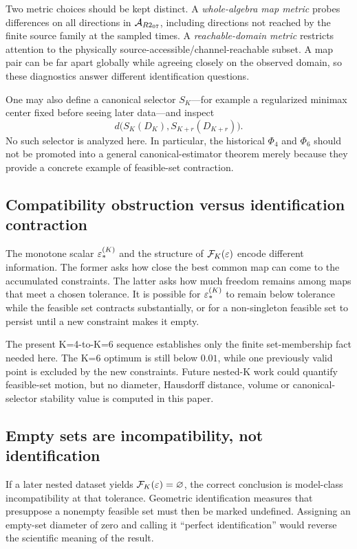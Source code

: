 Two metric choices should be kept distinct.  A \emph{whole-algebra map metric} probes differences on all directions in $\mathcal A_{R2_{07}}$, including directions not reached by the finite source family at the sampled times.  A \emph{reachable-domain metric} restricts attention to the physically source-accessible/channel-reachable subset.  A map pair can be far apart globally while agreeing closely on the observed domain, so these diagnostics answer different identification questions.

One may also define a canonical selector $S_K$---for example a regularized minimax center fixed before seeing later data---and inspect
\begin{equation}
d\bigl(S_K(D_K),S_{K+r}(D_{K+r})\bigr).
\end{equation}
No such selector is analyzed here.  In particular, the historical $\Phi_4$ and $\Phi_6$ should not be promoted into a general canonical-estimator theorem merely because they provide a concrete example of feasible-set contraction.

\subsection{Compatibility obstruction versus identification contraction}

The monotone scalar $\varepsilon_*^{(K)}$ and the structure of $\mathcal F_K(\varepsilon)$ encode different information.  The former asks how close the best common map can come to the accumulated constraints.  The latter asks how much freedom remains among maps that meet a chosen tolerance.  It is possible for $\varepsilon_*^{(K)}$ to remain below tolerance while the feasible set contracts substantially, or for a non-singleton feasible set to persist until a new constraint makes it empty.

The present K=4-to-K=6 sequence establishes only the finite set-membership fact needed here.  The K=6 optimum is still below $0.01$, while one previously valid point is excluded by the new constraints.  Future nested-K work could quantify feasible-set motion, but no diameter, Hausdorff distance, volume or canonical-selector stability value is computed in this paper.

\subsection{Empty sets are incompatibility, not identification}

If a later nested dataset yields $\mathcal F_K(\varepsilon)=\varnothing$, the correct conclusion is model-class incompatibility at that tolerance.  Geometric identification measures that presuppose a nonempty feasible set must then be marked undefined.  Assigning an empty-set diameter of zero and calling it ``perfect identification'' would reverse the scientific meaning of the result.
